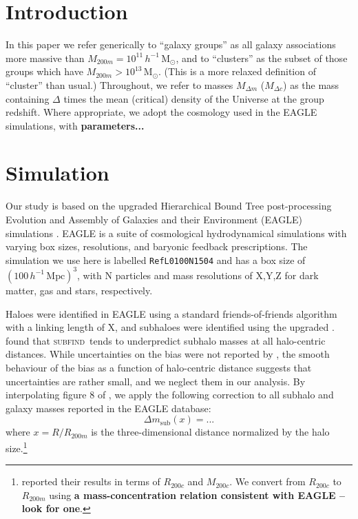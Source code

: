\documentclass[usenatbib,fleqn]{mnras}
\newcommand{\Msun}{\mathrm{M}_\odot}
\newcommand{\hMsun}{h^{-1}\,\Msun}
\newcommand{\hMpc}{h^{-1}\,\mathrm{Mpc}}
\newcommand{\subfind}{\textsc{subfind}}
\begin{document}
\section{Introduction}

In this paper we refer generically to ``galaxy groups'' as all galaxy associations more massive than $M_{200m}=10^{11}\,\hMsun$, and to ``clusters'' as the subset of those groups which have $M_{200m}>10^{13}\,\Msun$. (This is a more relaxed definition of ``cluster'' than usual.) Throughout, we refer to masses $M_{\Delta m}$ ($M_{\Delta c}$) as the mass containing $\Delta$ times the mean (critical) density of the Universe at the group redshift. Where appropriate, we adopt the cosmology used in the EAGLE simulations,  with \textbf{parameters...}


\section{Simulation}

Our study is based on the upgraded Hierarchical Bound Tree \citep[HBT+,][]{han18} post-processing Evolution and Assembly of Galaxies and their Environment (EAGLE) simulations \citep{schaye15,crain15}. EAGLE is a suite of cosmological hydrodynamical simulations with varying box sizes, resolutions, and baryonic feedback prescriptions. The simulation we use here is labelled \texttt{RefL0100N1504} and has a box size of $(100\,\hMpc)^3$, with N particles and mass resolutions of X,Y,Z for dark matter, gas and stars, respectively.

Haloes were identified in EAGLE using a standard friends-of-friends algorithm with a linking length of X, and subhaloes were identified using the upgraded . \cite{knebe11} found that \subfind\ tends to underpredict subhalo masses at all halo-centric distances. While uncertainties on the bias were not reported by \cite{knebe11}, the smooth behaviour of the bias as a function of halo-centric distance suggests that uncertainties are rather small, and we neglect them in our analysis. By interpolating figure 8 of \cite{knebe11}, we apply the following correction to all subhalo and galaxy masses reported in the EAGLE database:
\begin{equation}\label{eq:subfind_correction}
  \Delta m_\mathrm{sub}(x) = ...
\end{equation}
where $x=R/R_{200m}$ is the three-dimensional distance normalized by the halo size.\footnote{\cite{knebe11} reported their results in terms of $R_{200c}$ and $M_{200c}$. We convert from $R_{200c}$ to $R_{200m}$ using \textbf{a mass-concentration relation consistent with EAGLE -- look for one}.}
\end{document}
